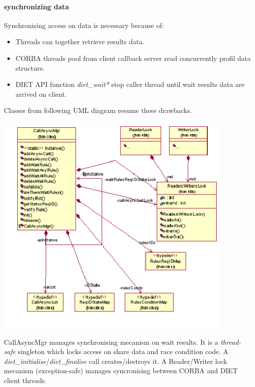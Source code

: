   \paragraph{synchronizing data}
  Synchronising access on data is necessary because of:
  \begin{itemize}
  \item Threads can together retrieve results data.
  \item CORBA threads pool from client callback server read concurrently
  profil data structure.
  \item DIET API function \emph{diet\_wait*} stop caller thread until wait
  results data are arrived on client.
  \end{itemize}
  Classes from following UML diagram resume these drawbacks.

  \includegraphics{./fig/CallBackSynchronisationClassDiagram2}

  CallAsyncMgr manages synchronising mecanism on wait results. It is a \emph{thread-safe}
  singleton which locks access on share data and race condition code. A
  \emph{diet\_initialise}/\emph{diet\_finalise} call creates/destroys it. A
  Reader/Writer lock mecanism (exception-safe) manages syncronising between
  CORBA and DIET client threads.

